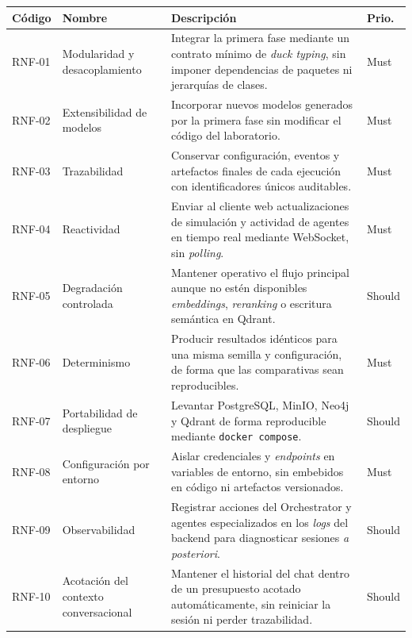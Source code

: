 \begin{table}[H]
\begin{center}
\scriptsize
\setlength{\tabcolsep}{3.5pt}
\renewcommand{\arraystretch}{1.02}
\begin{tabular}{|>{\raggedright\arraybackslash}p{1.15cm}|>{\raggedright\arraybackslash}p{2.35cm}|>{\raggedright\arraybackslash}p{6.25cm}|>{\raggedright\arraybackslash}p{0.95cm}|} \hline
\textbf{Código} & \textbf{Nombre} & \textbf{Descripción} & \textbf{Prio.} \\ \hline
RNF-01 & Modularidad y desacoplamiento & Integrar la primera fase mediante un contrato mínimo de \textit{duck typing}, sin imponer dependencias de paquetes ni jerarquías de clases. & Must \\ \hline
RNF-02 & Extensibilidad de modelos & Incorporar nuevos modelos generados por la primera fase sin modificar el código del laboratorio. & Must \\ \hline
RNF-03 & Trazabilidad & Conservar configuración, eventos y artefactos finales de cada ejecución con identificadores únicos auditables. & Must \\ \hline
RNF-04 & Reactividad & Enviar al cliente web actualizaciones de simulación y actividad de agentes en tiempo real mediante WebSocket, sin \textit{polling}. & Must \\ \hline
RNF-05 & Degradación controlada & Mantener operativo el flujo principal aunque no estén disponibles \textit{embeddings}, \textit{reranking} o escritura semántica en Qdrant. & Should \\ \hline
RNF-06 & Determinismo & Producir resultados idénticos para una misma semilla y configuración, de forma que las comparativas sean reproducibles. & Must \\ \hline
RNF-07 & Portabilidad de despliegue & Levantar PostgreSQL, MinIO, Neo4j y Qdrant de forma reproducible mediante \texttt{docker compose}. & Should \\ \hline
RNF-08 & Configuración por entorno & Aislar credenciales y \textit{endpoints} en variables de entorno, sin embebidos en código ni artefactos versionados. & Must \\ \hline
RNF-09 & Observabilidad & Registrar acciones del Orchestrator y agentes especializados en los \textit{logs} del backend para diagnosticar sesiones \textit{a posteriori}. & Should \\ \hline
RNF-10 & Acotación del contexto conversacional & Mantener el historial del chat dentro de un presupuesto acotado automáticamente, sin reiniciar la sesión ni perder trazabilidad. & Should \\ \hline

\end{tabular}
\end{center}
\end{table}
